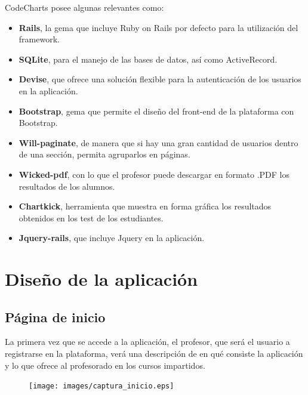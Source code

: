 CodeCharts posee algunas relevantes como:

\begin{itemize}
    \item \textbf{Rails}, la gema que incluye Ruby on Rails por defecto para la utilización del framework.
    \item \textbf{SQLite}\cite{SQLite}, para el manejo de las bases de datos, así como ActiveRecord.
    \item \textbf{Devise}\cite{Devise}, que ofrece una solución flexible para la autenticación de los usuarios en la aplicación.
    \item \textbf{Bootstrap}\cite{BootstrapGem}, gema que permite el diseño del front-end de la plataforma con Bootstrap.
    \item \textbf{Will-paginate}\cite{Paginate}, de manera que si hay una gran cantidad de usuarios dentro de una sección, permita agruparlos en páginas.
    \item \textbf{Wicked-pdf}\cite{WickedPDF}, con lo que el profesor puede descargar en formato .PDF los resultados de los alumnos.
    \item \textbf{Chartkick}, herramienta que muestra en forma gráfica los resultados obtenidos en los test de los estudiantes.
    \item \textbf{Jquery-rails}\cite{JqueryRails}, que incluye Jquery en la aplicación. 
\end{itemize}


\section{Diseño de la aplicación}
\label{1:sec:2}

\subsection{Página de inicio}
\label{1:sec:1}

La primera vez que se accede a la aplicación, el profesor, que será el usuario a registrarse en la plataforma, verá una descripción de en qué consiste la aplicación y lo que ofrece al profesorado en los cursos impartidos.

\begin{figure}[!th]
\begin{center}
\texttt{[image: images/captura\_inicio.eps]}
\label{fig:11}
\end{center}
\end{figure}

